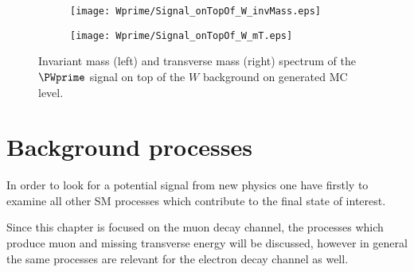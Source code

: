 \begin{figure}
\begin{subfigure}{.5\textwidth}
  \centering
  \texttt{[image: Wprime/Signal\_onTopOf\_W\_invMass.eps]}
\end{subfigure}%
\begin{subfigure}{.5\textwidth}
  \centering
  \texttt{[image: Wprime/Signal\_onTopOf\_W\_mT.eps]}
\end{subfigure}
\caption{Invariant mass (left) and transverse mass (right) spectrum of the $\PWprime$ signal 
on top of the $W$ background on generated MC level.}
  \label{fig:signal_with_W}
\end{figure}



\section{Background processes}
\label{sec:wprimeBackgrounds}

In order to look for a potential signal from new physics one have firstly to examine all other SM processes which contribute to the final state of interest.


Since this chapter is focused on the muon decay channel, the processes which produce muon and missing transverse energy will be discussed, 
however in general the same processes are relevant for the electron decay channel as well.

